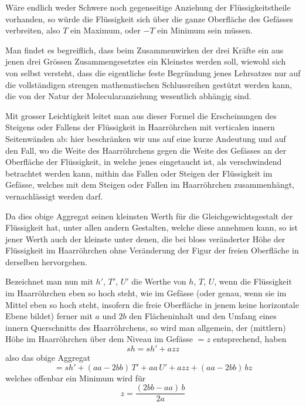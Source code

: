 \documentclass[12pt,a4paper]{article}
\begin{document}
Wäre endlich weder Schwere noch gegenseitige Anziehung der Flüssigkeitstheile vorhanden, so würde die Flüssigkeit sich über die ganze Oberfläche des Gefässes verbreiten, also $T$ ein Maximum, oder $-T$ ein Minimum sein müssen.

Man findet es begreiflich, dass beim Zusammenwirken der drei Kräfte ein aus jenen drei Grössen Zusammengesetztes ein Kleinstes werden soll, wiewohl sich von selbst versteht, dass die eigentliche feste Begründung jenes Lehrsatzes nur auf die vollständigen strengen mathematischen Schlussreihen gestützt werden kann, die von der Natur der Molecularanziehung wesentlich abhängig sind.

\bigskip

Mit grosser Leichtigkeit leitet man aus dieser Formel die Erscheinungen des Steigens oder Fallens der Flüssigkeit in Haarröhrchen mit verticalen innern Seitenwänden ab: hier beschränken wir uns auf eine kurze Andeutung und auf den Fall, wo die Weite des Haarröhrchens gegen die Weite des Gefässes an der Oberfläche der Flüssigkeit, in welche jenes eingetaucht ist, als verschwindend betrachtet werden kann, mithin das Fallen oder Steigen der Flüssigkeit im Gefässe, welches mit dem Steigen oder Fallen im Haarröhrchen zusammenhängt, vernachlässigt werden darf.

Da dies obige Aggregat seinen kleinsten Werth für die Gleichgewichtsgestalt der Flüssigkeit hat, unter allen andern Gestalten, welche diese annehmen kann, so ist jener Werth auch der kleinste unter denen, die bei bloss veränderter Höhe der Flüssigkeit im Haarröhrchen ohne Veränderung der Figur der freien Oberfläche in derselben hervorgehen.

Bezeichnet man nun mit $h'$, $T'$, $U'$ die Werthe von $h$, $T$, $U$, wenn die Flüssigkeit im Haarröhrchen eben so hoch steht, wie im Gefässe (oder genau, wenn sie im Mittel eben so hoch steht, insofern die freie Oberfläche in jenem keine horizontale Ebene bildet) ferner mit $a$ und $2b$ den Flächeninhalt und den Umfang eines innern Querschnitts des Haarröhrchens, so wird man allgemein, der (mittlern) Höhe im Haarröhrchen über dem Niveau im Gefässe $=z$ entsprechend, haben
\begin{equation*}
    sh = sh' + azz
\end{equation*}
also das obige Aggregat
\begin{equation*}
    = sh' + (aa - 2\mathit{bb})\,T' + aa\,U' + azz + (aa - 2\mathit{bb})\,bz
\end{equation*}
welches offenbar ein Minimum wird für
\begin{equation*}
    z = \frac{(2\mathit{bb} - aa)\,b}{2a}
\end{equation*}
\end{document}
